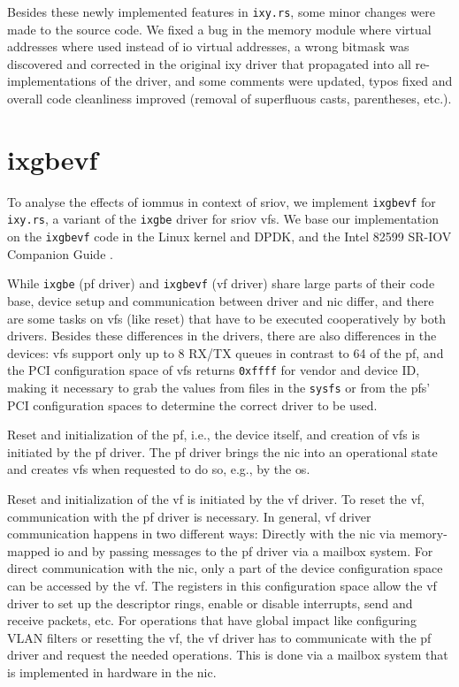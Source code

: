 Besides these newly implemented features in \texttt{ixy.rs}, some minor changes
were made to the source code. We fixed a bug in the memory module where virtual
addresses where used instead of \ac{io} virtual addresses, a wrong bitmask was
discovered and corrected in the original ixy driver \cite{emmerich2019user} that
propagated into all re-implementations \cite{emmerich2019case} of the driver,
and some comments were updated, typos fixed and overall code cleanliness
improved (removal of superfluous casts, parentheses, etc.).


\section{ixgbevf}
\label{sec:ixgbevf}

To analyse the effects of \acp{iommu} in context of \ac{sriov}, we implement
\texttt{ixgbevf} for \texttt{ixy.rs}, a variant of the \texttt{ixgbe} driver for
\ac{sriov} \acp{vf}. We base our implementation on the \texttt{ixgbevf} code in
the Linux kernel and DPDK, and the Intel 82599 SR-IOV Companion Guide
\cite{intel201082599}.

While \texttt{ixgbe} (\ac{pf} driver) and \texttt{ixgbevf} (\ac{vf} driver)
share large parts of their code base, device setup and communication between
driver and \ac{nic} differ, and there are some tasks on \acp{vf} (like reset)
that have to be executed cooperatively by both drivers. Besides these
differences in the drivers, there are also differences in the devices: \acp{vf}
support only up to 8 RX/TX queues in contrast to 64 of the \ac{pf}, and the PCI
configuration space of \acp{vf} returns \texttt{0xffff} for vendor and device
ID, making it necessary to grab the values from files in the \texttt{sysfs} or
from the \acp{pf}' PCI configuration spaces to determine the correct driver to
be used.

Reset and initialization of the \ac{pf}, i.e., the device itself, and creation
of \acp{vf} is initiated by the \ac{pf} driver. The \ac{pf} driver brings the
\ac{nic} into an operational state and creates \acp{vf} when requested to do so,
e.g., by the \ac{os}.

Reset and initialization of the \ac{vf} is initiated by the \ac{vf} driver. To
reset the \ac{vf}, communication with the \ac{pf} driver is necessary. In
general, \ac{vf} driver communication happens in two different ways: Directly
with the \ac{nic} via memory-mapped \ac{io} and by passing messages to the
\ac{pf} driver via a mailbox system. For direct communication with the \ac{nic},
only a part of the device configuration space can be accessed by the \ac{vf}.
The registers in this configuration space allow the \ac{vf} driver to set up the
descriptor rings, enable or disable interrupts, send and receive packets, etc.
For operations that have global impact like configuring VLAN filters or
resetting the \ac{vf}, the \ac{vf} driver has to communicate with the \ac{pf}
driver and request the needed operations. This is done via a mailbox system that
is implemented in hardware in the \ac{nic}.


